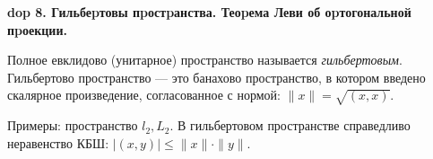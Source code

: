 \setcounter{section}{4}
\setcounter{subsection}{8}
\setcounter{equation}{0}
\textbf{\LARGE dop 8. Гильбеpтовы пpостpанства. Теоpема Леви об оpтогональной пpоекции.}

\begin{definition}
Полное евклидово (унитарное) пространство называется \emph{гильбертовым}. Гильбертово пространство --- это банахово пространство, в котором введено скалярное произведение, согласованное с нормой: $\|x\| = \sqrt{(x, x)}$.
\end{definition}

\begin{Commentwhite}
Примеры: пространство $l_2, L_2$. В гильбертовом пространстве справедливо неравенство КБШ: $|(x, y)|\le\|x\|\cdot\|y\|$.
\end{Commentwhite}

